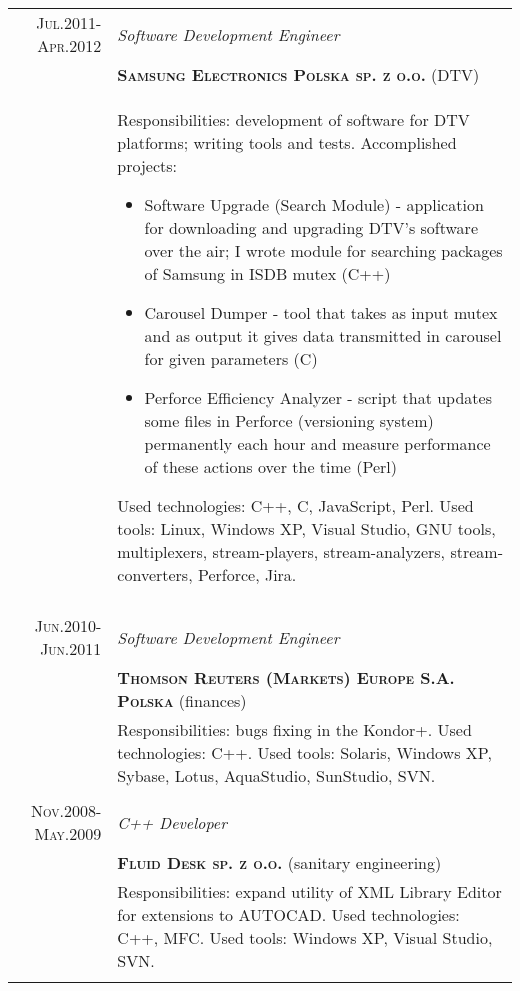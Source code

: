 \documentclass[a4paper,12pt]{article}
\begin{document}
\begin{tabular}{r|p{11cm}}
	\textsc{Jul.2011-Apr.2012}
	&\emph{Software Development Engineer}\\
	&\textsc{\textbf{Samsung Electronics Polska sp. z o.o.}} (DTV)\\
	&\footnotesize{
		Responsibilities: development of software for DTV platforms; writing tools and tests.\newline
		Accomplished projects:
			\begin{itemize}
				\item Software Upgrade (Search Module) - application for downloading and upgrading DTV's software over the air; I wrote module for
				searching packages of Samsung in ISDB mutex (C++)
				\item Carousel Dumper - tool that takes as input mutex and as output it gives data transmitted in carousel for given parameters (C)
				\item Perforce Efficiency Analyzer - script that updates some files in Perforce (versioning system) permanently each hour and measure
				performance of these actions over the time (Perl)
			\end{itemize}
		Used technologies: C++, C, JavaScript, Perl. Used tools: Linux, Windows XP, Visual Studio, GNU tools, multiplexers,
		stream-players, stream-analyzers, stream-converters, Perforce, Jira.
	}\\
	\multicolumn{2}{c}{}\\



	\textsc{Jun.2010-Jun.2011}
	&\emph{Software Development Engineer}\\
	&\textsc{\textbf{Thomson Reuters (Markets) Europe S.A. Polska}} (finances)\\
	&\footnotesize{ Responsibilities: bugs fixing in the Kondor+. Used technologies: C++.
		Used tools: Solaris, Windows XP, Sybase, Lotus, AquaStudio, SunStudio, SVN.}\\
	\multicolumn{2}{c}{}\\

	\textsc{Nov.2008-May.2009}
	&\emph{C++ Developer}\\
	&\textsc{\textbf{Fluid Desk sp. z o.o.}} (sanitary engineering)\\
	&\footnotesize{Responsibilities: expand utility of XML Library Editor for extensions
		to AUTOCAD. Used technologies: C++, MFC. Used tools: Windows XP, Visual Studio, SVN.}\\
	\multicolumn{2}{c}{}\\
\end{tabular}
\end{document}
